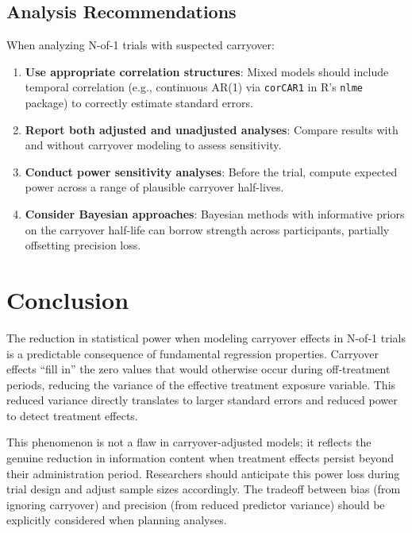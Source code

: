 \documentclass[11pt,letterpaper]{article}
\begin{document}
\subsection{Analysis Recommendations}

When analyzing N-of-1 trials with suspected carryover:

\begin{enumerate}
    \item \textbf{Use appropriate correlation structures}: Mixed models should
          include temporal correlation (e.g., continuous AR(1) via
          \texttt{corCAR1} in R's \texttt{nlme} package) to correctly estimate
          standard errors.

    \item \textbf{Report both adjusted and unadjusted analyses}: Compare
          results with and without carryover modeling to assess sensitivity.

    \item \textbf{Conduct power sensitivity analyses}: Before the trial,
          compute expected power across a range of plausible carryover
          half-lives.

    \item \textbf{Consider Bayesian approaches}: Bayesian methods with
          informative priors on the carryover half-life can borrow strength
          across participants, partially offsetting precision loss.
\end{enumerate}

\section{Conclusion}

The reduction in statistical power when modeling carryover effects in N-of-1
trials is a predictable consequence of fundamental regression properties.
Carryover effects ``fill in'' the zero values that would otherwise occur
during off-treatment periods, reducing the variance of the effective treatment
exposure variable. This reduced variance directly translates to larger
standard errors and reduced power to detect treatment effects.

This phenomenon is not a flaw in carryover-adjusted models; it reflects the
genuine reduction in information content when treatment effects persist beyond
their administration period. Researchers should anticipate this power loss
during trial design and adjust sample sizes accordingly. The tradeoff between
bias (from ignoring carryover) and precision (from reduced predictor variance)
should be explicitly considered when planning analyses.
\end{document}
